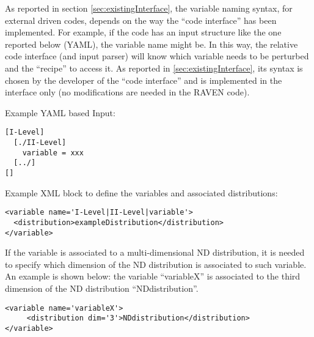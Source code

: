 As reported in section \ref{sec:existingInterface}, the variable naming syntax,
for external driven codes, depends on the way the ``code interface'' has been
implemented.
%
For example, if the code has an input structure like the one reported below (YAML), the
variable name might be.
%
In this way, the relative code interface (and input parser) will know which
variable needs to be perturbed and the ``recipe'' to access it.
%
As reported in \ref{sec:existingInterface}, its syntax is chosen by the
developer of the ``code interface'' and is implemented in the interface only
(no modifications are needed in the RAVEN code).


Example YAML based Input:
\begin{lstlisting}
[I-Level]
  [./II-Level]
    variable = xxx
  [../]
[]
\end{lstlisting}

Example XML block to define the variables and associated distributions:
\begin{lstlisting}[style=XML]
<variable name='I-Level|II-Level|variable'>
  <distribution>exampleDistribution</distribution>
</variable>
\end{lstlisting}

If the variable is associated to a multi-dimensional ND distribution, it is needed to specify which dimension of the ND distribution is associated to such variable. An example is shown below: the variable  ``variableX'' is associated to the third dimension of the ND distribution ``NDdistribution''.

\begin{lstlisting}[style=XML]
<variable name='variableX'>
     <distribution dim='3'>NDdistribution</distribution>
</variable>
\end{lstlisting}

